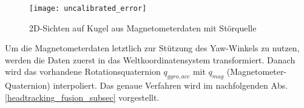 \begin{figure}[ht]
	\centering
    \texttt{[image: uncalibrated\_error]}
	\caption[]{2D-Sichten auf Kugel aus Magnetometerdaten mit Störquelle}
	\label{fig:uncalibrated_error}
\end{figure}

Um die Magnetometerdaten letztlich zur Stützung des Yaw-Winkels zu nutzen, werden die Daten zuerst in das Weltkoordinatensystem transformiert.
Danach wird das vorhandene Rotationsquaternion $q_{gyro,acc}$ mit $q_{mag}$ (Magnetometer-Quaternion) interpoliert.
Das genaue Verfahren wird im nachfolgenden Abs. \ref{headtracking_fusion_subsec} vorgestellt.
